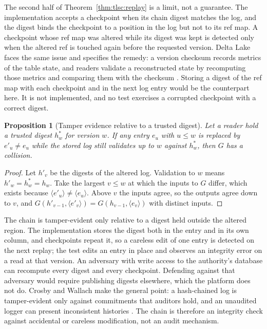 \documentclass[11pt,letterpaper]{article}
\newtheorem{proposition}[theorem]{Proposition}
\theoremstyle{definition}
\theoremstyle{remark}
\begin{document}
The second half of Theorem~\ref{thm:tlsc:replay} is a limit, not a guarantee. The implementation accepts a checkpoint when its chain digest matches the log, and the digest binds the checkpoint to a position in the log but not to its ref map. A checkpoint whose ref map was altered while its digest was kept is detected only when the altered ref is touched again before the requested version. Delta Lake faces the same issue and specifies the remedy: a version checksum records metrics of the table state, and readers validate a reconstructed state by recomputing those metrics and comparing them with the checksum \cite{deltaprotocol}. Storing a digest of the ref map with each checkpoint and in the next log entry would be the counterpart here. It is not implemented, and no test exercises a corrupted checkpoint with a correct digest.

\begin{proposition}[Tamper evidence relative to a trusted digest]
\label{prop:tlsc:tamper}
Let a reader hold a trusted digest $h^{*}_w$ for version $w$. If any entry $e_u$ with $u\leq w$ is replaced by $e'_u\neq e_u$ while the stored log still validates up to $w$ against $h^{*}_w$, then $G$ has a collision.
\end{proposition}

\begin{proof}
Let $h'_v$ be the digests of the altered log. Validation to $w$ means $h'_w=h^{*}_w=h_w$. Take the largest $v\leq w$ at which the inputs to $G$ differ, which exists because $\langle e'_u\rangle\neq\langle e_u\rangle$. Above $v$ the inputs agree, so the outputs agree down to $v$, and $G(h'_{v-1},\langle e'_v\rangle)=G(h_{v-1},\langle e_v\rangle)$ with distinct inputs.
\end{proof}

The chain is tamper-evident only relative to a digest held outside the altered region. The implementation stores the digest both in the entry and in its own column, and checkpoints repeat it, so a careless edit of one entry is detected on the next replay; the test  edits an entry in place and observes an integrity error on a read at that version. An adversary with write access to the authority's database can recompute every digest and every checkpoint. Defending against that adversary would require publishing digests elsewhere, which the platform does not do. Crosby and Wallach make the general point: a hash-chained log is tamper-evident only against commitments that auditors hold, and an unaudited logger can present inconsistent histories \cite{crosby2009}. The chain is therefore an integrity check against accidental or careless modification, not an audit mechanism.
\end{document}
